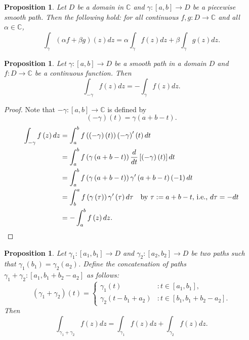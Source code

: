 \documentclass[12pt,openany]{book}
\newtheorem{proposition}[theorem]{Proposition}
\theoremstyle{definition}
\newcommand{\C}{\mathbb{C}}
\newcommand{\of}[1]{\left( #1 \right)}
\newcommand{\ie}{\textnormal{i.e.}}
\begin{document}
	\begin{tcolorbox}[colback=white,colframe=procolor,arc=5pt,title={\color{white}\bf Linearity of Integration}]
		\begin{proposition}
			Let $D$ be a domain in $\C$ and $\gamma:[a,b]\to D$ be a piecewise smooth path. Then the following hold: for all continuous $f,g:D\to\C$ and all $\alpha\in\C$, \[
			\int_\gamma\left(\alpha f+\beta g\right)\of{z}dz=\alpha\int_\gamma f\of{z}dz+\beta\int_\gamma g\of{z}dz.
			\]
		\end{proposition}
	\end{tcolorbox}
	\vspace{4pt}
	\begin{tcolorbox}[colback=white,colframe=procolor,arc=5pt,title={\color{white}\bf }]
		\begin{proposition}
			Let $\gamma:[a,b]\to D$ be a smooth path in a domain $D$ and $f:D\to\C$ be a continuous function. Then \[
			\int_{-\gamma}f\of{z}dz = -\int_{\gamma}f\of{z}dz.
			\]
		\end{proposition}
	\end{tcolorbox}
	\begin{proof}
		Note that $-\gamma:[a,b]\to\C$ is defined by \[
		\of{-\gamma}\of{t}=\gamma\of{a+b-t}.
		\]\begin{align*}
		\int_{-\gamma}f\of{z}dz &=\int_a^bf\of{\of{-\gamma}\of{t}}\of{-\gamma}'\of{t}dt\\
		&=\int_a^bf\of{\gamma\of{a+b-t}}\frac{d}{dt}\left[\of{-\gamma}\of{t}\right]dt\\
		&=\int_a^bf\of{\gamma\of{a+b-t}}\gamma'\of{a+b-t}\of{-1}dt\\
		&=\int_b^af\of{\gamma\of{\tau}}\gamma'\of{\tau}d\tau\quad\text{by $\tau:=a+b-t$, \ie, $d\tau=-dt$}\\
		&=-\int_a^bf\of{z}dz.
		\end{align*}
	\end{proof}
	\vspace{4pt}
	\begin{tcolorbox}[colback=white,colframe=procolor,arc=5pt,title={\color{white}\bf Concatenation of Paths}]
		\begin{proposition}
			Let $\gamma_1:[a_1,b_1]\to D$ and $\gamma_2:[a_2,b_2]\to D$ be two paths such that $\gamma_1\of{b_1}=\gamma_2\of{a_2}$. Define the concatenation of paths $\gamma_1+\gamma_2:\left[a_1,b_1+b_2-a_2\right]$ as follows: \[
			\of{\gamma_1+\gamma_2}\of{t}=\begin{cases}
			\gamma_1\of{t} &:t\in[a_1,b_1],\\
			\gamma_2\of{t-b_1+a_2} &:t\in[b_1,b_1+b_2-a_2].
			\end{cases}
			\] Then \[
			\int_{\gamma_1+\gamma_2}f\of{z}dz=\int_{\gamma_1}f\of{z}dz+\int_{\gamma_2}f\of{z}dz.
			\]
		\end{proposition}
	\end{tcolorbox}
\end{document}

